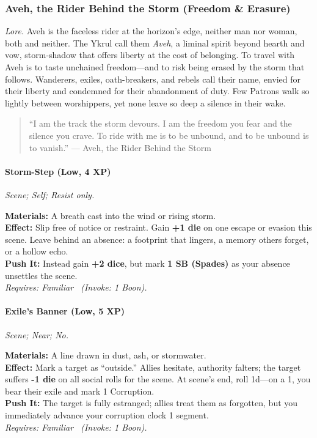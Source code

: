 \subsubsection{Aveh, the Rider Behind the Storm (Freedom \& Erasure)}
\textit{Lore.} Aveh is the faceless rider at the horizon’s edge, neither man nor woman, both and neither. The Ykrul call them \textit{Aveh}, a liminal spirit beyond hearth and vow, storm-shadow that offers liberty at the cost of belonging. To travel with Aveh is to taste unchained freedom—and to risk being erased by the storm that follows. Wanderers, exiles, oath-breakers, and rebels call their name, envied for their liberty and condemned for their abandonment of duty. Few Patrons walk so lightly between worshippers, yet none leave so deep a silence in their wake.

\begin{quote}
``I am the track the storm devours. I am the freedom you fear and the silence you crave. To ride with me is to be unbound, and to be unbound is to vanish.'' — Aveh, the Rider Behind the Storm
\end{quote}

\paragraph{Storm-Step (Low, 4 XP)}  
\emph{Scene; Self; Resist only.}  

\textbf{Materials:} A breath cast into the wind or rising storm.\\
\textbf{Effect:} Slip free of notice or restraint. Gain \textbf{+1 die} on one escape or evasion this scene. Leave behind an absence: a footprint that lingers, a memory others forget, or a hollow echo.\\
\textbf{Push It:} Instead gain \textbf{+2 dice}, but mark \textbf{1 SB (Spades)} as your absence unsettles the scene.\\
\emph{Requires: Familiar \ (\textit{Invoke:} 1 Boon).}

\paragraph{Exile’s Banner (Low, 5 XP)}  
\emph{Scene; Near; No.}  

\textbf{Materials:} A line drawn in dust, ash, or stormwater.\\
\textbf{Effect:} Mark a target as “outside.” Allies hesitate, authority falters; the target suffers \textbf{-1 die} on all social rolls for the scene. At scene’s end, roll 1d—on a 1, you bear their exile and mark 1 Corruption.\\
\textbf{Push It:} The target is fully estranged; allies treat them as forgotten, but you immediately advance your corruption clock 1 segment.\\
\emph{Requires: Familiar \ (\textit{Invoke:} 1 Boon).}

